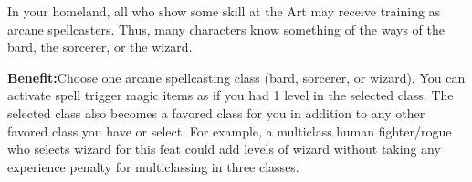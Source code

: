 
In your homeland, all who show some skill at the Art may receive training as arcane spellcasters. Thus, many characters know something of the ways of the bard, the sorcerer, or the wizard.

\textbf{Benefit:}Choose one arcane spellcasting class (bard, sorcerer, or wizard). You can activate spell trigger magic items as if you had 1 level in the selected class. The selected class also becomes a favored class for you in addition to any other favored class you have or select. For example, a multiclass human fighter/rogue who selects wizard for this feat could add levels of wizard without taking any experience penalty for multiclassing in three classes.